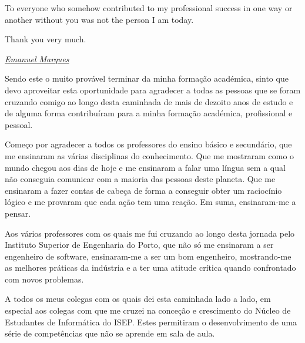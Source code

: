 \begin{acknowledgements}
\par

To everyone who somehow contributed to my professional success in one way or another without you was not the person I am today.


\par
Thank you very much.

\par

\begin{flushright}
   \underline{\textit{Emanuel Marques}}
\end{flushright}


\end{acknowledgements}

\begin{acknowledgementsotherlanguage}
Sendo este o muito provável terminar da minha formação académica, sinto que devo aproveitar esta oportunidade para agradecer a todas as pessoas que se foram cruzando comigo ao longo desta caminhada de mais de dezoito anos de estudo e de alguma forma contribuíram para a minha formação académica, profissional e pessoal.
\par
Começo por agradecer a todos os professores do ensino básico e secundário, que me ensinaram as várias disciplinas do conhecimento. Que me mostraram como o mundo chegou aos dias de hoje e me ensinaram a falar uma língua sem a qual não conseguia comunicar com a maioria das pessoas deste planeta. Que me ensinaram a fazer contas de cabeça de forma a conseguir obter um raciocínio lógico e me provaram que cada ação tem uma reação. Em suma, ensinaram-me a pensar.

\par

Aos vários professores com os quais me fui cruzando ao longo desta jornada pelo Instituto Superior de Engenharia do Porto, que não só me ensinaram a ser engenheiro de software, ensinaram-me a ser um bom engenheiro, mostrando-me as melhores práticas da indústria e a ter uma atitude crítica quando confrontado com novos problemas.

\par

A todos os meus colegas com os quais dei esta caminhada lado a lado, em especial aos colegas com que me cruzei na conceção e crescimento do Núcleo de Estudantes de Informática do ISEP. Estes permitiram o desenvolvimento de uma série de competências que não se aprende em sala de aula.

\par


\end{acknowledgementsotherlanguage}
